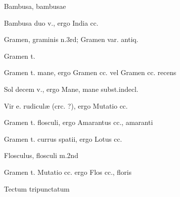  {\mktsStyleItalic{}Bambusa\/}, bambusae


 {\mktsStyleItalic{}Bambusa duo v.\/}, ergo {\mktsStyleItalic{}India cc.\/}


 {\mktsStyleItalic{}Gramen\/}, graminis {\mktsStyleItalic{}n.3rd\/}; {\mktsStyleItalic{}Gramen\/} var. {\mktsStyleItalic{}antiq.\/}


 {\mktsStyleItalic{}Gramen t.\/}


 {\mktsStyleItalic{}Gramen t. mane\/}, ergo {\mktsStyleItalic{}Gramen cc.\/} vel {\mktsStyleItalic{}Gramen cc. recens\/}


 {\mktsStyleItalic{}Sol decem v.\/}, ergo {\mktsStyleItalic{}Mane\/}, mane {\mktsStyleItalic{}subst.indecl.\/}


 {\mktsStyleItalic{}Vir e. rudiculæ\/} (crc. ?), ergo {\mktsStyleItalic{}Mutatio cc.\/}


 {\mktsStyleItalic{}Gramen t. flosculi\/}, ergo {\mktsStyleItalic{}Amarantus cc.\/}, amaranti


 {\mktsStyleItalic{}Gramen t. currus spatii\/}, ergo {\mktsStyleItalic{}Lotus cc.\/}


 {\mktsStyleItalic{}Flosculus\/}, flosculi {\mktsStyleItalic{}m.2nd\/}


 {\mktsStyleItalic{}Gramen t. Mutatio cc.\/} ergo {\mktsStyleItalic{}Flos cc.\/}, floris


 {\mktsStyleItalic{}Tectum tripunctatum\/}


